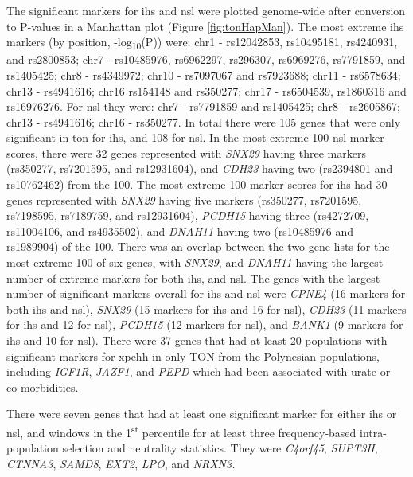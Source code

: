 \documentclass[]{report}
\begin{document}
The significant markers for \gls{ihs} and \gls{nsl} were plotted
genome-wide after conversion to P-values in a Manhattan plot (Figure
\ref{fig:tonHapMan}). The most extreme \gls{ihs} markers (by position,
-log\textsubscript{10}(P)) were: chr1 - rs12042853, rs10495181,
rs4240931, and rs2800853; chr7 - rs10485976, rs6962297, rs296307,
rs6969276, rs7791859, and rs1405425; chr8 - rs4349972; chr10 - rs7097067
and rs7923688; chr11 - rs6578634; chr13 - rs4941616; chr16 rs154148 and
rs350277; chr17 - rs6504539, rs1860316 and rs16976276. For \gls{nsl}
they were: chr7 - rs7791859 and rs1405425; chr8 - rs2605867; chr13 -
rs4941616; chr16 - rs350277. In total there were 105 genes that were
only significant in \gls{ton} for \gls{ihs}, and 108 for \gls{nsl}. In
the most extreme 100 \gls{nsl} marker scores, there were 32 genes
represented with \emph{SNX29} having three markers (rs350277, rs7201595,
and rs12931604), and \emph{CDH23} having two (rs2394801 and rs10762462)
from the 100. The most extreme 100 marker scores for \gls{ihs} had 30
genes represented with \emph{SNX29} having five markers (rs350277,
rs7201595, rs7198595, rs7189759, and rs12931604), \emph{PCDH15} having
three (rs4272709, rs11004106, and rs4935502), and \emph{DNAH11} having
two (rs10485976 and rs1989904) of the 100. There was an overlap between
the two gene lists for the most extreme 100 of six genes, with
\emph{SNX29}, and \emph{DNAH11} having the largest number of extreme
markers for both \gls{ihs}, and \gls{nsl}. The genes with the largest
number of significant markers overall for \gls{ihs} and \gls{nsl} were
\emph{CPNE4} (16 markers for both \gls{ihs} and \gls{nsl}), \emph{SNX29}
(15 markers for \gls{ihs} and 16 for \gls{nsl}), \emph{CDH23} (11
markers for \gls{ihs} and 12 for \gls{nsl}), \emph{PCDH15} (12 markers
for \gls{nsl}), and \emph{BANK1} (9 markers for \gls{ihs} and 10 for
\gls{nsl}). There were 37 genes that had at least 20 populations with
significant markers for \gls{xpehh} in only TON from the Polynesian
populations, including \emph{IGF1R}, \emph{JAZF1}, and \emph{PEPD} which
had been associated with urate or co-morbidities.

There were seven genes that had at least one significant marker for
either \gls{ihs} or \gls{nsl}, and windows in the 1\textsuperscript{st}
percentile for at least three frequency-based intra-population selection
and neutrality statistics. They were \emph{C4orf45}, \emph{SUPT3H},
\emph{CTNNA3}, \emph{SAMD8}, \emph{EXT2}, \emph{LPO}, and \emph{NRXN3.}
\end{document}
